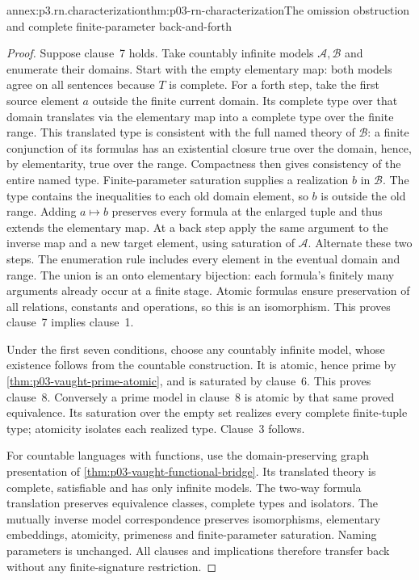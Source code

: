 \begin{annexitem}{annex:p3.rn.characterization}{thm:p03-rn-characterization}{The omission obstruction and complete finite-parameter back-and-forth}
\begin{proof}
Suppose clause~7 holds. Take countably infinite models
\(\mathcal A,\mathcal B\) and enumerate their domains.
Start with the empty elementary map: both models agree
on all sentences because \(T\) is complete.
For a forth step, take the first source element \(a\)
outside the finite current domain.
Its complete type over that domain translates via the
elementary map into a complete type over the finite range.
This translated type is consistent with the full named
theory of \(\mathcal B\): a finite conjunction of its
formulas has an existential closure true over the domain,
hence, by elementarity, true over the range.
Compactness then gives consistency of the entire named type.
Finite-parameter saturation supplies a realization \(b\)
in \(\mathcal B\).
The type contains the inequalities to each old domain
element, so \(b\) is outside the old range.
Adding \(a\mapsto b\) preserves every formula at the
enlarged tuple and thus extends the elementary map.
At a back step apply the same argument to the inverse
map and a new target element, using saturation of
\(\mathcal A\).
Alternate these two steps. The enumeration rule includes
every element in the eventual domain and range.
The union is an onto elementary bijection: each formula's
finitely many arguments already occur at a finite stage.
Atomic formulas ensure preservation of all relations,
constants and operations, so this is an isomorphism.
This proves clause~7 implies clause~1.

Under the first seven conditions, choose any countably
infinite model, whose existence follows from the
countable construction. It is atomic, hence prime by
\cref{thm:p03-vaught-prime-atomic}, and is saturated
by clause~6. This proves clause~8.
Conversely a prime model in clause~8 is atomic by that
same proved equivalence. Its saturation over the empty
set realizes every complete finite-tuple type; atomicity
isolates each realized type. Clause~3 follows.

For countable languages with functions, use the
domain-preserving graph presentation of
\cref{thm:p03-vaught-functional-bridge}.
Its translated theory is complete, satisfiable and
has only infinite models.
The two-way formula translation preserves equivalence
classes, complete types and isolators.
The mutually inverse model correspondence preserves
isomorphisms, elementary embeddings, atomicity,
primeness and finite-parameter saturation.
Naming parameters is unchanged.
All clauses and implications therefore transfer back
without any finite-signature restriction.
\end{proof}
\end{annexitem}

